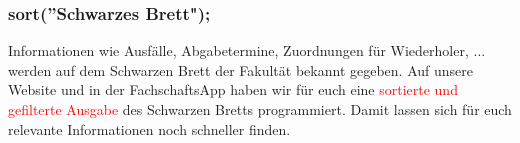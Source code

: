 \subsubsection{sort(''Schwarzes Brett");}
Informationen wie Ausfälle, Abgabetermine, Zuordnungen für 
Wiederholer, ... werden auf dem Schwarzen Brett der Fakultät bekannt 
gegeben. Auf unsere Website und in der FachschaftsApp haben wir 
für euch eine \textcolor{red}{sortierte und gefilterte Ausgabe} des Schwarzen Bretts 
programmiert. Damit lassen sich für euch relevante Informationen noch 
schneller finden. 